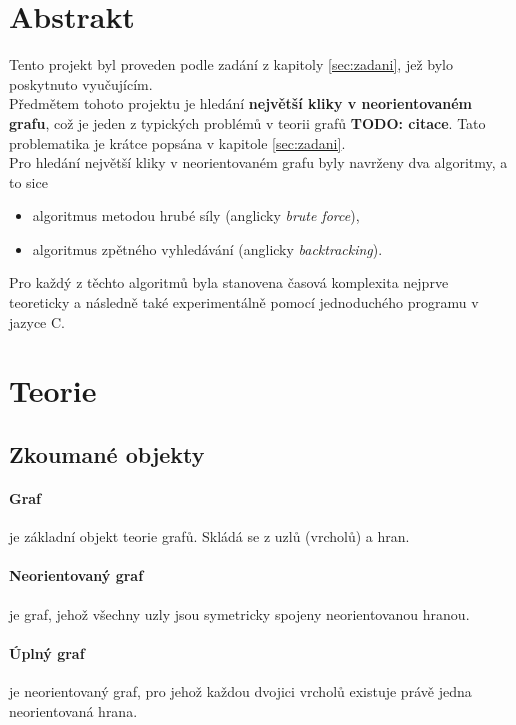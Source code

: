 \documentclass[a4paper]{article}
\begin{document}
\section{Abstrakt} \label{sec:abstrakt}
    Tento projekt byl proveden podle zadání z kapitoly \ref{sec:zadani}, jež bylo poskytnuto vyučujícím.\\
    
    \noindent
    Předmětem tohoto projektu je hledání \textbf{největší kliky v neorientovaném grafu}, což je jeden z typických problémů v teorii grafů \textbf{TODO: citace}. Tato problematika je krátce popsána v kapitole \ref{sec:zadani}.\\
    
    \noindent
    Pro hledání největší kliky v neorientovaném grafu byly navrženy dva algoritmy, a to sice
    \begin{itemize}
        \item algoritmus metodou hrubé síly (anglicky \textit{brute force}),
        \item algoritmus zpětného vyhledávání (anglicky \textit{backtracking}).
    \end{itemize}
    Pro každý z těchto algoritmů byla stanovena časová komplexita nejprve teoreticky a následně také experimentálně pomocí jednoduchého programu v jazyce C.
    
\section{Teorie} \label{sec:teorie}
    \subsection{Zkoumané objekty}
        \paragraph{Graf} je základní objekt teorie grafů. Skládá se z uzlů (vrcholů) a hran.\cite{slu_zaklad-teo-grafu}
        
        \paragraph{Neorientovaný graf}
        je graf, jehož všechny uzly jsou symetricky spojeny neorientovanou hranou.\cite{slu_zaklad-teo-grafu}
        
        \paragraph{Úplný graf} je neorientovaný graf, pro jehož každou dvojici vrcholů existuje právě jedna neorientovaná hrana.\cite{slu_zaklad-teo-grafu}
        
\end{document}
